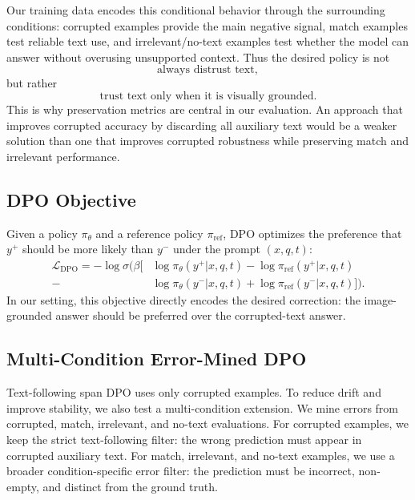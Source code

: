 Our training data encodes this conditional behavior through the surrounding conditions:
corrupted examples provide the main negative signal, match examples test reliable text use, and irrelevant/no-text examples test whether the model can answer without overusing unsupported context.
Thus the desired policy is not
\begin{equation}
\text{always distrust text},
\end{equation}
but rather
\begin{equation}
\text{trust text only when it is visually grounded}.
\end{equation}
This is why preservation metrics are central in our evaluation.
An approach that improves corrupted accuracy by discarding all auxiliary text would be a weaker solution than one that improves corrupted robustness while preserving match and irrelevant performance.

\subsection{DPO Objective}

Given a policy $\pi_\theta$ and a reference policy $\pi_{\mathrm{ref}}$, DPO optimizes the preference that $y^+$ should be more likely than $y^-$ under the prompt $(x,q,t)$:
\begin{equation}
\begin{split}
\mathcal{L}_{\mathrm{DPO}}
= - \log \sigma \Big(
\beta \big[
& \log \pi_\theta(y^+|x,q,t)
- \log \pi_{\mathrm{ref}}(y^+|x,q,t) \\
-& \log \pi_\theta(y^-|x,q,t)
+ \log \pi_{\mathrm{ref}}(y^-|x,q,t)
\big] \Big).
\end{split}
\end{equation}
In our setting, this objective directly encodes the desired correction:
the image-grounded answer should be preferred over the corrupted-text answer.

\subsection{Multi-Condition Error-Mined DPO}

Text-following span DPO uses only corrupted examples.
To reduce drift and improve stability, we also test a multi-condition extension.
We mine errors from corrupted, match, irrelevant, and no-text evaluations.
For corrupted examples, we keep the strict text-following filter: the wrong prediction must appear in corrupted auxiliary text.
For match, irrelevant, and no-text examples, we use a broader condition-specific error filter: the prediction must be incorrect, non-empty, and distinct from the ground truth.

